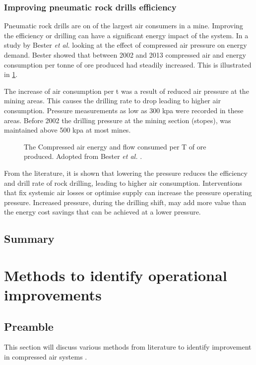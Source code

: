 		\subsubsection{Improving pneumatic rock drills efficiency}
		 Pneumatic rock drills are on of the largest air consumers in a mine. Improving the efficiency or drilling can have a significant energy impact of the system. In a study by  Bester \textit{et al.} \cite{bester2013effect} looking at the effect of compressed air pressure on energy demand. Bester showed that between 2002 and 2013 compressed air and energy consumption per tonne of ore produced had steadily increased. This is illustrated  in \cref{fig: Compressed energy and air flow per ton}. 
		 \par 
		 The increase of air consumption per \gls{t} was a result of reduced air pressure at the mining areas. This causes the drilling rate to drop leading to higher air consumption. Pressure measurements as low as 300 \gls{kpa} were recorded in these areas. Before 2002 the drilling pressure at the mining section (stopes), was maintained above 500 \gls{kpa} at most mines. 
		 \par 
		 \begin{figure}[h]
		 	\centering
		 	
		 	\caption[The Compressed air energy and flow consumed per T of ore produced.]{The Compressed air energy and flow consumed per T of ore produced. Adopted from Bester \textit{et al.} \cite{bester2013effect}.}
		 	\label{fig: Compressed energy and air flow per ton}
		 \end{figure}
		 From the literature, it is shown that lowering the pressure reduces the efficiency and drill rate of rock drilling, leading to higher air consumption. Interventions that fix systemic air losses or optimise supply can increase the pressure operating pressure. Increased pressure, during the drilling shift, may add more value than the energy cost savings that can be achieved at a lower pressure.
	\subsection{Summary}
\clearpage
\section{Methods to identify operational improvements}
	\subsection{Preamble}
		This section will discuss various methods from literature to identify improvement in compressed air systems . 
